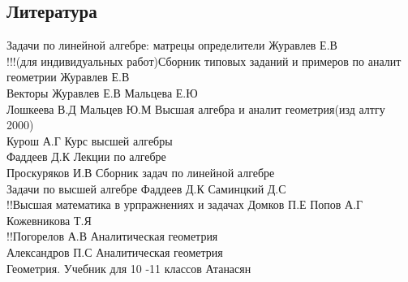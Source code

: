 \documentclass[a4paper, 12pt]{article}
\begin{document}
\newpage
\subsection*{Литература}
Задачи по линейной алгебре: матрецы определители Журавлев Е.В\\
!!!(для индивидуальных работ)Сборник типовых заданий и примеров по аналит геометрии Журавлев Е.В\\
Векторы Журавлев Е.В Мальцева Е.Ю\\
Лошкеева В.Д Мальцев Ю.М Высшая алгебра и аналит геометрия(изд алтгу 2000)\\
Курош А.Г Курс высшей алгебры\\
Фаддеев Д.К Лекции по алгебре\\
Проскуряков И.В Сборник задач по линейной алгебре\\
Задачи по высшей алгебре Фаддеев Д.К Саминцкий Д.С\\
!!Высшая математика в урпражнениях и задачах Домков П.Е Попов А.Г Кожевникова Т.Я\\
!!Погорелов А.В Аналитическая геометрия\\
Александров П.С Аналитическая геометрия\\
Геометрия. Учебник для 10 -11 классов Атанасян\\
\end{document}
